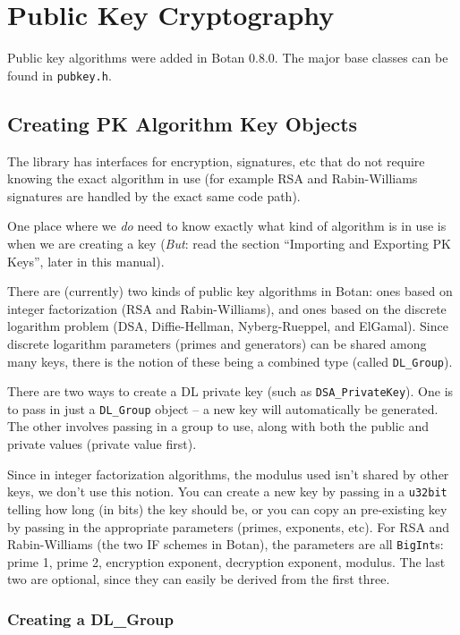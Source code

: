 \documentclass{article}
\newcommand{\filename}[1]{\texttt{#1}}
\newcommand{\type}[1]{\texttt{#1}}
\begin{document}
\pagebreak

\section{Public Key Cryptography}

Public key algorithms were added in Botan 0.8.0. The major base classes can be
found in \filename{pubkey.h}.

\subsection{Creating PK Algorithm Key Objects}

The library has interfaces for encryption, signatures, etc that do not require
knowing the exact algorithm in use (for example RSA and Rabin-Williams
signatures are handled by the exact same code path).

One place where we \emph{do} need to know exactly what kind of algorithm is in
use is when we are creating a key (\emph{But}: read the section ``Importing and
Exporting PK Keys'', later in this manual).

There are (currently) two kinds of public key algorithms in Botan: ones based
on integer factorization (RSA and Rabin-Williams), and ones based on the
discrete logarithm problem (DSA, Diffie-Hellman, Nyberg-Rueppel, and
ElGamal). Since discrete logarithm parameters (primes and generators) can be
shared among many keys, there is the notion of these being a combined type
(called \type{DL\_Group}).

There are two ways to create a DL private key (such as
\type{DSA\_PrivateKey}). One is to pass in just a \type{DL\_Group} object -- a
new key will automatically be generated. The other involves passing in a group
to use, along with both the public and private values (private value first).

Since in integer factorization algorithms, the modulus used isn't shared by
other keys, we don't use this notion. You can create a new key by passing in a
\type{u32bit} telling how long (in bits) the key should be, or you can copy an
pre-existing key by passing in the appropriate parameters (primes, exponents,
etc). For RSA and Rabin-Williams (the two IF schemes in Botan), the parameters
are all \type{BigInt}s: prime 1, prime 2, encryption exponent, decryption
exponent, modulus. The last two are optional, since they can easily be derived
from the first three.

\subsubsection{Creating a DL\_Group}
\end{document}
